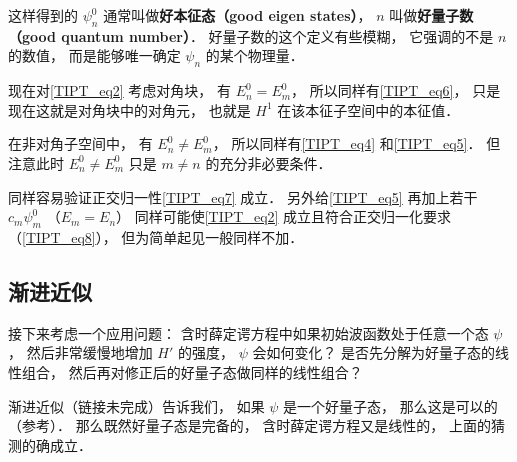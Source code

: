 这样得到的 $\psi_n^0$ 通常叫做\textbf{好本征态（good eigen states）}， $n$ 叫做\textbf{好量子数（good quantum number）}． 好量子数的这个定义有些模糊， 它强调的不是 $n$ 的数值， 而是能够唯一确定 $\psi_n$ 的某个物理量．

现在对\autoref{TIPT_eq2} 考虑对角块， 有 $E_n^0 = E_m^0$， 所以同样有\autoref{TIPT_eq6}， 只是现在这就是对角块中的对角元， 也就是 $H^1$ 在该本征子空间中的本征值．

在非对角子空间中， 有 $E_n^0 \ne E_m^0$， 所以同样有\autoref{TIPT_eq4} 和\autoref{TIPT_eq5}． 但注意此时 $E_n^0 \ne E_m^0$ 只是 $m \ne n$ 的充分非必要条件．

同样容易验证正交归一性\autoref{TIPT_eq7} 成立． 另外给\autoref{TIPT_eq5} 再加上若干 $c_m \psi_m^0$ （$E_m = E_n$） 同样可能使\autoref{TIPT_eq2} 成立且符合正交归一化要求（\autoref{TIPT_eq8}）， 但为简单起见一般同样不加．

\subsection{渐进近似}
接下来考虑一个应用问题： 含时薛定谔方程中如果初始波函数处于任意一个态 $\psi$， 然后非常缓慢地增加 $H'$ 的强度， $\psi$ 会如何变化？ 是否先分解为好量子态的线性组合， 然后再对修正后的好量子态做同样的线性组合？

渐进近似（链接未完成）告诉我们， 如果 $\psi$ 是一个好量子态， 那么这是可以的（参考\cite{GriffQ}）． 那么既然好量子态是完备的， 含时薛定谔方程又是线性的， 上面的猜测的确成立．
